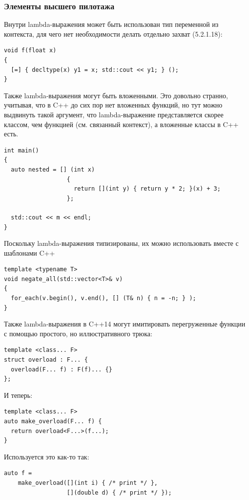 \documentclass[a4paper,12pt,oneside]{article}
\begin{document}
\subsubsection{Элементы высшего пилотажа}

Внутри lambda-выражения может быть использован тип переменной из контекста, для чего нет необходимости делать отдельно захват (5.2.1.18):

\begin{lstlisting}
void f(float x) 
{
  [=] { decltype(x) y1 = x; std::cout << y1; } ();
}
\end{lstlisting}

Также lambda-выражения могут быть вложенными. Это довольно странно, учитывая, что в C++ до сих пор нет вложенных функций, но тут можно выдвинуть такой аргумент, что lambda-выражение представляется скорее классом, чем функцией (см. связанный контекст), а вложенные классы в C++ есть.

\begin{lstlisting}
int main()
{
  auto nested = [] (int x) 
                  { 
                    return [](int y) { return y * 2; }(x) + 3; 
                  };

  std::cout << m << endl;
}
\end{lstlisting}

Поскольку lambda-выражения типизированы, их можно использовать вместе с шаблонами C++

\begin{lstlisting}
template <typename T> 
void negate_all(std::vector<T>& v)
{
  for_each(v.begin(), v.end(), [] (T& n) { n = -n; } );
}
\end{lstlisting}

Также lambda-выражения в C++14 могут имитировать перегруженные функции с помощью простого, но иллюстративного трюка:

\begin{lstlisting}
template <class... F>
struct overload : F... {
  overload(F... f) : F(f)... {} 
};
\end{lstlisting}

И теперь:
 
\begin{lstlisting}
template <class... F>
auto make_overload(F... f) {
  return overload<F...>(f...);  
}
\end{lstlisting}

Используется это как-то так:

\begin{lstlisting}
auto f =
    make_overload([](int i) { /* print */ },
                  [](double d) { /* print */ });
\end{lstlisting}
\end{document}
